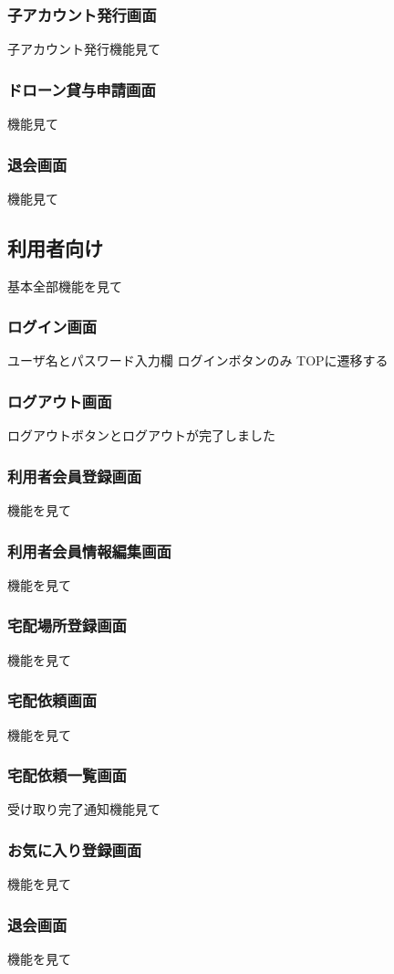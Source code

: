 \documentclass[a4paper, titlepage]{jsarticle}
\begin{document}
\subsubsection{子アカウント発行画面}
子アカウント発行機能見て
\subsubsection{ドローン貸与申請画面}
機能見て
\subsubsection{退会画面}
機能見て

\subsection{利用者向け}
基本全部機能を見て
\subsubsection{ログイン画面}
ユーザ名とパスワード入力欄
ログインボタンのみ
TOPに遷移する
\subsubsection{ログアウト画面}
ログアウトボタンとログアウトが完了しました
\subsubsection{利用者会員登録画面}
機能を見て
\subsubsection{利用者会員情報編集画面}
機能を見て
\subsubsection{宅配場所登録画面}
機能を見て
\subsubsection{宅配依頼画面}
機能を見て
\subsubsection{宅配依頼一覧画面}
受け取り完了通知機能見て
\subsubsection{お気に入り登録画面}
機能を見て
\subsubsection{退会画面}
機能を見て
\end{document}
